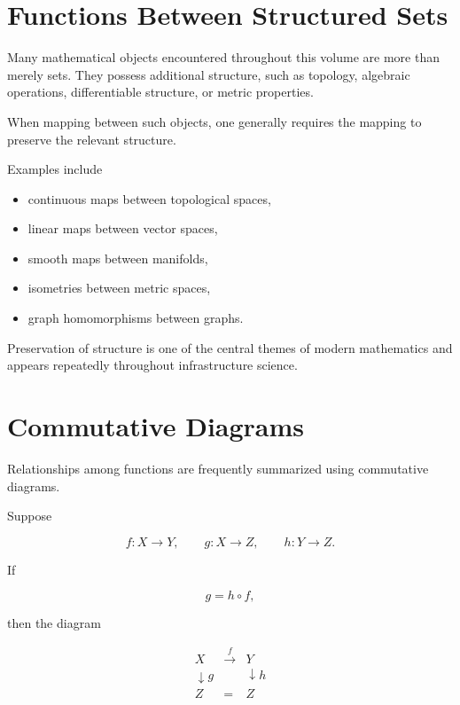 \documentclass[11pt,fleqn]{book}
\numberwithin{equation}{chapter}
\theoremstyle{plain}
\theoremstyle{definition}
\theoremstyle{remark}
\begin{document}

\section{Functions Between Structured Sets}

Many mathematical objects encountered throughout this volume are more
than merely sets. They possess additional structure, such as topology,
algebraic operations, differentiable structure, or metric properties.

When mapping between such objects, one generally requires the mapping to
preserve the relevant structure.

Examples include

\begin{itemize}
\item continuous maps between topological spaces,
\item linear maps between vector spaces,
\item smooth maps between manifolds,
\item isometries between metric spaces,
\item graph homomorphisms between graphs.
\end{itemize}

Preservation of structure is one of the central themes of modern
mathematics and appears repeatedly throughout infrastructure science.


\section{Commutative Diagrams}

Relationships among functions are frequently summarized using
commutative diagrams.

Suppose

\[
f:X\rightarrow Y,
\qquad
g:X\rightarrow Z,
\qquad
h:Y\rightarrow Z.
\]

If

\[
g
=
h\circ f,
\]

then the diagram

\[
\begin{array}{ccc}
X & \xrightarrow{f} & Y\\
\downarrow g & & \downarrow h\\
Z & = & Z
\end{array}
\]
\end{document}
